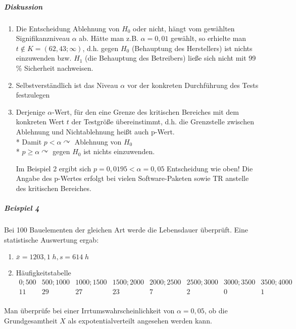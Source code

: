 \documentclass[a4paper]{scrartcl}
\begin{document}
\subparagraph{Diskussion}
\begin{enumerate}
\item Die Entscheidung Ablehnung von $H_0$ oder nicht, hängt vom gewählten Signifikanzniveau $\alpha$ ab. Hätte man z.B. $\alpha = 0,01$ gewählt, so erhielte man  $t \notin K = (62,43;\infty)$, d.h.  gegen $H_0$ (Behauptung des Herstellers) ist nichts einzuwenden bzw. $H_1$ (die Behauptung des Betreibers) ließe sich nicht mit 99 \% Sicherheit nachweisen.
\item Selbstverständlich ist das Niveau $\alpha$ vor der konkreten Durchführung des Tests festzulegen
\item Derjenige $\alpha$-Wert, für den eine Grenze des kritischen Bereiches mit dem konkreten Wert $t$ der Testgröße übereinstimmt, d.h. die Grenzstelle zwischen Ablehnung und Nichtablehnung heißt auch p-Wert.\\*
Damit $p < \alpha \curvearrowright$ Ablehnung von $H_0$\\*
$p \geq \alpha \curvearrowright$ gegen $H_0$ ist nichts einzuwenden.

Im Beispiel 2 ergibt sich $p=0,0195 < \alpha = 0,05$ Entscheidung wie oben! Die Angabe des p-Wertes erfolgt bei vielen Software-Paketen sowie TR anstelle des kritischen Bereiches.
\end{enumerate}

\subparagraph{Beispiel 4}
Bei 100 Bauelementen der gleichen Art werde die Lebensdauer überprüft. Eine statistische Auswertung ergab:
\begin{enumerate}
\item $\bar{x} = 1203,1 \; h, s= 614 \; h$
\item Häufigkeitstabelle\\
$\begin{array}{c|c|c|c|c|c|c|c}
0;500 & 500;1000 & 1000;1500&1500;2000&2000;2500&2500;3000&3000;3500&3500;4000\\ \hline
11 & 29 & 27 & 23 & 7 & 2 & 0 & 1\\
\end{array}$\\
\end{enumerate}
Man überprüfe bei einer Irrtumswahrscheinlichkeit von $\alpha = 0,05$, ob die Grundgesamtheit $X$ als expotentialverteilt angesehen werden kann.
\end{document}
